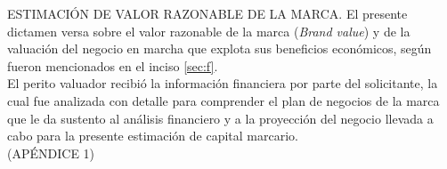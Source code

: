 \textcolor{secundario}{ESTIMACI\'ON DE VALOR RAZONABLE DE LA MARCA.} El presente dictamen versa sobre el valor razonable de la marca \activoIntangibleMarca(\textit{Brand value}) y de la valuaci\'on del negocio en marcha que explota sus beneficios econ\'omicos, seg\'un fueron mencionados en el inciso \autoref{sec:f}.\\[10pt]

El perito valuador recibi\'o la informaci\'on financiera por parte del solicitante, la cual fue analizada con detalle para comprender el plan de negocios de la marca que le da sustento al an\'alisis financiero y a la proyecci\'on del negocio llevada a cabo para la presente estimaci\'on de capital marcario.\\[10pt] (\textcolor{terciario}{AP\'ENDICE 1})

